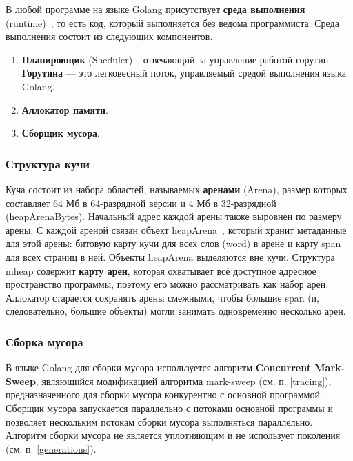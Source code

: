 В любой программе на языке Golang присутствует \textbf{среда выполнения} (runtime)~\cite{golang_runtime}, то есть код, который выполняется без ведома программиста. Среда выполнения состоит из следующих компонентов.

\begin{enumerate}[label*=\arabic*.]
	\item \textbf{Планировщик} (Sheduler)~\cite{golang_scheduler}, отвечающий за управление работой горутин. \textbf{Горутина} --- это легковесный поток, управляемый средой выполнения языка Golang.~\cite{golang_goroutine}
	\item \textbf{Аллокатор памяти}.
	\item \textbf{Сборщик мусора}.
\end{enumerate}

\subsubsection{Структура кучи}

Куча состоит из набора областей, называемых \textbf{аренами} (Arena), размер которых составляет 64 Мб в 64-разрядной версии и 4 Мб в 32-разрядной (heapArenaBytes). Начальный адрес каждой арены также выровнен по размеру арены.  С каждой ареной связан объект heapArena~\cite{golang_mheap}, который хранит метаданные для этой арены: битовую карту кучи для всех слов (word) в арене и карту span для всех страниц в ней. Объекты heapArena выделяются вне кучи. Структура mheap содержит \textbf{карту арен}, которая охватывает всё доступное адресное пространство программы, поэтому его можно рассматривать как набор арен. Аллокатор старается сохранять арены смежными, чтобы большие span (и, следовательно, большие объекты) могли занимать одновременно несколько арен.~\cite{golang_malloc}

\subsubsection{Сборка мусора}

В языке Golang для сборки мусора используется алгоритм \textbf{Concurrent Mark-Sweep}, являющийся модификацией алгоритма mark-sweep (см. п. \ref{tracing}), предназначенного для сборки мусора конкурентно с основной программой. Сборщик мусора запускается параллельно с потоками основной программы и позволяет нескольким потокам сборки мусора выполняться параллельно. Алгоритм сборки мусора не является уплотняющим и не использует поколения (см. п. \ref{generations}).~\cite{golang_gc}

